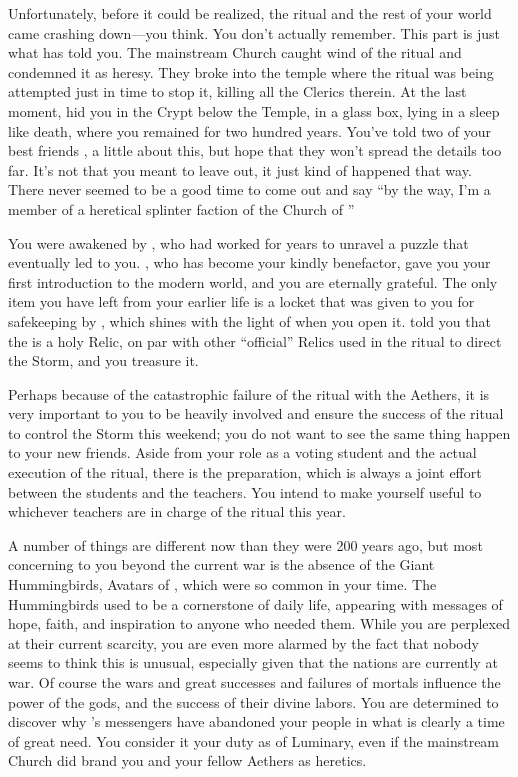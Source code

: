 \documentclass[char]{GL2020}
\begin{document}
Unfortunately, before it could be realized, the ritual and the rest of your world came crashing down---you think. You don't actually remember. This part is just what \cWildCard{} has told you. The mainstream Church caught wind of the ritual and condemned it as heresy. They broke into the temple where the ritual was being attempted just in time to stop it, killing all the Clerics therein. At the last moment, \cDisneyMentor{} hid you in the Crypt below the Temple, in a glass box, lying in a sleep like death, where you remained for two hundred years. You've told two of your best friends \cPirateChild{}, \cTechStar{} a little about this, but hope that they won't spread the details too far. It's not that you meant to leave \cAdopted{} out, it just kind of happened that way. There never seemed to be a good time to come out and say ``by the way, I'm a member of a heretical splinter faction of the Church of \cFarmGod{}''

You were awakened by \cWildCard{}, who had worked for years to unravel a puzzle that eventually led \cWildCard{\them} to you. \cWildCard{}, who has become your kindly benefactor, gave you your first introduction to the modern world, and you are eternally grateful. The only item you have left from your earlier life is a locket that was given to you for safekeeping by \cDisneyMentor{}, which shines with the light of \cFarmGod{} when you open it. \cDisneyMentor{} told you that the \iLocket{} is a holy Relic, on par with other ``official'' Relics used in the ritual to direct the Storm, and you treasure it. 

Perhaps because of the catastrophic failure of the ritual with the Aethers, it is very important to you to be heavily involved and ensure the success of the ritual to control the Storm this weekend; you do not want to see the same thing happen to your new friends. Aside from your role as a voting student and the actual execution of the ritual, there is the preparation, which is always a joint effort between the students and the teachers. You intend to make yourself useful to whichever teachers are in charge of the ritual this year. 

A number of things are different now than they were 200 years ago, but most concerning to you beyond the current war is the absence of the Giant Hummingbirds, Avatars of \cFarmGod{}, which were so common in your time. The Hummingbirds used to be a cornerstone of daily life, appearing with messages of hope, faith, and inspiration to anyone who needed them. While you are perplexed at their current scarcity, you are even more alarmed by the fact that nobody seems to think this is unusual, especially given that the nations are currently at war. Of course the wars and great successes and failures of mortals influence the power of the gods, and the success of their divine labors. You are determined to discover why \cFarmGod{}'s messengers have abandoned your people in what is clearly a time of great need. You consider it your duty as \cDisney{\cleric} of Luminary, even if the mainstream Church did brand you and your fellow Aethers as heretics. 
\end{document}
